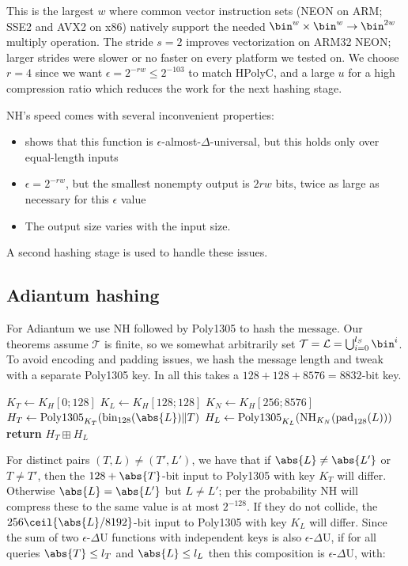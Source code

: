 \documentclass[eprint.tex]{subfiles}
\begin{document}
This is the largest $w$ where common vector instruction sets (NEON on ARM; SSE2
and AVX2 on x86) natively support the needed $\bin^w \times \bin^w \rightarrow
\bin^{2w}$ multiply operation.  The stride $s=2$ improves vectorization on
ARM32 NEON; larger strides were slower or no faster on every platform we tested
on. We choose $r=4$ since we want $\epsilon = 2^{-rw} \leq 2^{-103}$ to match
HPolyC, and a large $u$ for a high compression ratio which reduces the work for
the next hashing stage.

NH's speed comes with several inconvenient properties:
\begin{itemize}
    \item \cite{umac2} shows that this function is $\epsilon$-almost-$\Delta$-universal, but this
        holds only over equal-length inputs
    \item $\epsilon = 2^{-rw}$, but the smallest nonempty output is $2rw$ bits, twice as large
        as necessary for this $\epsilon$ value
    \item The output size varies with the input size.
\end{itemize}
A second hashing stage is used to handle these issues.

\subsection{Adiantum hashing}

For Adiantum we use NH followed by Poly1305 to hash the message.
Our theorems assume $\mathcal{T}$ is finite,
so we somewhat arbitrarily set
$\mathcal{T} = \mathcal{L} = \bigcup_{i=0}^{l_S}\bin^i$.
To avoid encoding and padding issues, we hash the message length and tweak with
a separate Poly1305 key.
In all this takes a $128 + 128 + 8576 = 8832$-bit key.

\begin{algorithmic}[0]
    \State $K_T \gets K_H[0;128]$
    \State $K_L \gets K_H[128;128]$
    \State $K_N \gets K_H[256;8576]$
    \State $H_T \gets \Polydjb_{K_T}(\fromint_{128}(\abs{L}) \Concat T)$
    \State $H_L \gets \operatorname{Poly1305}_{K_L}(\operatorname{NH}_{K_N}(\operatorname{pad}_{128}(L)))$
    \State \textbf{return} $H_T \boxplus H_L$
    \EndProcedure
\end{algorithmic}

For distinct pairs $(T,L) \neq (T', L')$, we have that if $\abs{L} \neq \abs{L'}$ or $T \neq T'$,
then the $128 + \abs{T}$-bit input to Poly1305 with key $K_T$ will differ.
Otherwise $\abs{L} = \abs{L'}$ but $L \neq L'$;
per \cite{umac2} the probability NH will compress these to the same value is at most
$2^{-128}$. If they do not collide, the $256\ceil{\abs{L}/8192}$-bit input to Poly1305 with key $K_L$
will differ. Since the sum of two $\epsilon$-$\Delta$U functions with independent keys is also
$\epsilon$-$\Delta$U, if for all queries $\abs{T} \leq l_T$ and $\abs{L} \leq l_L$ then
this composition is  $\epsilon$-$\Delta$U, with:
\end{document}
